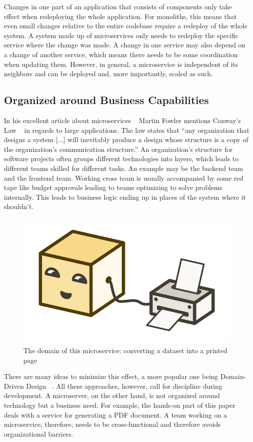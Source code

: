 Changes in one part of an application that consists of components only take effect when redeploying the whole application. For monoliths, this means that even small changes relative to the entire codebase require a redeploy of the whole system. A system made up of microservices only needs to redeploy the specific service where the change was made. A change in one service may also depend on a change of another service, which means there needs to be some coordination when updating them. However, in general, a microservice is independent of its neighbors and can be deployed and, more importantly, scaled as such.


\subsection{Organized around Business Capabilities}
\label{sec:theory:what:capabilities}

In his excellent article about microservices ~\cite{microservices.2014} Martin Fowler mentions Conway's Law ~\cite{conway.1968} in regards to large applications. The law states that ``any organization that designs a system [...] will inevitably produce a design whose structure is a copy of the organization's communication structure.'' An organization's structure for software projects often groups different technologies into layers, which leads to different teams skilled for different tasks. An example may be the backend team and the frontend team. Working cross team is usually accompanied by some red tape like budget approvals leading to teams optimizing to solve problems internally. This leads to business logic ending up in places of the system where it shouldn't.

\begin{figure}[ht]
  \centering
  \includegraphics[width=0.4\linewidth]{assets/illustration-microservice-printer.png}
  \caption{The domain of this microservice: converting a dataset into a printed page}
\end{figure}

There are many ideas to minimize this effect, a more popular one being Domain-Driven Design ~\cite{evans.2003}. All these approaches, however, call for discipline during development. A microserver, on the other hand, is not organized around technology but a business need. For example, the hands-on part of this paper deals with a service for generating a PDF document. A team working on a microservice, therefore, needs to be cross-functional and therefore avoids organizational barriers.


